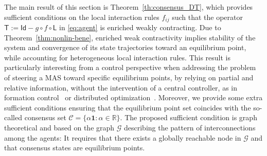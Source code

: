 \documentclass[journal,twoside,web]{ieeecolor}
\newcommand{\red}{\color{myred}}
\newcommand{\blue}{\color{myred}}
\newcommand{\rea }{\mathbb{R}}
\newcommand{\Xc}{\mathcal{X}}
\newcommand{\Ls}{\mathsf{L}}
\newcommand{\Ts}{\mathsf{T}}
\newcommand{\Is}{\mathsf{Id}}
\newcommand{\Gc}{\mathcal{G}}
\newcommand{\bone}{\boldsymbol{1}}
\newtheorem{lem}{Lemma}
\begin{document}
The main result of this section is Theorem~\ref{th:consensus_DT}, which provides sufficient conditions on the local interaction rules $f_{ij}$ such that the operator ${\Ts:=\Is-g\circ f\circ\Ls}$ in \eqref{eq:agent} is enriched weakly contracting. Due to Theorem~\ref{thm:nonlin-bene}, enriched weak contractivity implies stability of the system and convergence of its state trajectories toward an equilibrium point, while accounting for heterogeneous local interaction rules.
%
This result is particularly interesting from a control perspective when addressing the problem of steering a MAS toward specific equilibrium points, by relying on partial and relative information, without the intervention of a central controller, as in formation control~\cite{oh2015survey} or distributed optimization~\cite{yang2019survey}. 
%
Moreover, we provide some extra sufficient conditions ensuring that the equilibrium point set coincides with the so-called consensus set ${\mathcal{C}=\{\alpha\bone: \alpha\in \rea \}}$.
%
The proposed sufficient condition is graph theoretical and based on the graph $\Gc$ describing the pattern of interconnections among the agents: It requires that there exists a globally reachable node in $\Gc$ and that consensus states are equilibrium points.







\end{document}
